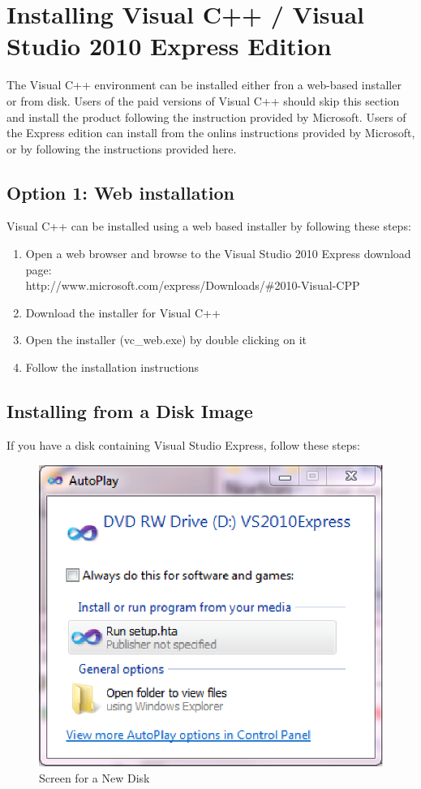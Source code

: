 \documentclass[letterpaper,10pt]{article}%
\begin{document}
\section{Installing Visual C++ / Visual Studio 2010 Express Edition}

The Visual C++ environment can be installed either fron a web-based installer or from disk.  Users of the paid versions of Visual C++ should skip this section and install the product following the instruction provided by Microsoft.  Users of the Express edition can install from the onlins instructions provided by Microsoft, or by following the instructions provided here.

\subsection{Option 1: Web installation}

Visual C++ can be installed using a web based installer by following these steps:

\begin{enumerate}
	\item Open a web browser and browse to the Visual Studio 2010 Express download page: \\http://www.microsoft.com/express/Downloads/\#2010-Visual-CPP
	\item Download the installer for Visual C++
	\item Open the installer (vc\_web.exe) by double clicking on it
	\item Follow the installation instructions
\end{enumerate}

\subsection{Installing from a Disk Image}

If you have a disk containing Visual Studio Express, follow these steps:

\begin{figure}
\centering
\includegraphics{DiskStart.eps}
\caption{Screen for a New Disk}
\label{fig:DiskStart}
\end{figure}
\end{document}
